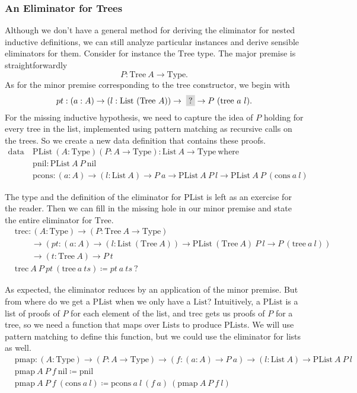 \documentclass{report}
\newcommand{\List}{\const{List}}
\newcommand{\nil}{\const{nil}}
\newcommand{\cons}{\const{cons}}
\newcommand{\PList}{\const{PList}}
\newcommand{\pnil}{\const{pnil}}
\newcommand{\pcons}{\const{pcons}}
\newcommand{\Tree}{\const{Tree}}
\newcommand{\tree}{\const{tree}}
\newcommand{\const}[1]{\text{#1}}
\newcommand{\hole}{\colorbox{gray!30}{?}}
\newcommand{\data}{\const{data}}
\newcommand{\Type}{\const{Type}}
\newcommand{\where}{\const{where}}
\begin{document}
\subsubsection{An Eliminator for Trees}


Although we don't have a general method for deriving the eliminator for nested inductive definitions, we can still analyze particular instances and derive sensible eliminators for them. Consider for instance the $\Tree$ type. The major premise is straightforwardly $$P: \Tree ~ A \to \Type.$$ As for the minor premise corresponding to the $\tree$ constructor, we begin with $$pt: (a: A) \to (l: \List ~ (\Tree ~ A)) \to \; \hole \to P ~ (\tree ~ a ~ l).$$ For the missing inductive hypothesis, we need to capture the idea of $P$ holding for every tree in the list, implemented using pattern matching as recursive calls on the trees. So we create a new data definition that contains these proofs.
%
\begin{align*}
    \data ~ &\PList ~ (A: \Type) (P: A \to \Type): \List ~ A \to \Type ~ \where \\
    &\pnil: \PList ~ A ~ P ~ \nil \\
    &\pcons: (a: A) \to (l: \List ~ A) \to P ~ a \to \PList ~ A ~ P ~ l \to \PList ~ A ~ P ~ (\cons ~ a ~ l)
\end{align*}

The type and the definition of the eliminator for $\PList$ is left as an exercise for the reader. Then we can fill in the missing hole in our minor premise and state the entire eliminator for $\Tree$.
%
\begin{align*}
    &\const{trec}: (A: \Type) \to (P: \Tree ~ A \to \Type) \\
    &\qquad\to (pt: (a: A) \to (l: \List ~ (\Tree ~ A)) \to \PList ~ (\Tree ~ A) ~ P ~ l \to P ~ (\tree ~ a ~ l)) \\
    &\qquad\to (t: \Tree ~ A) \to P ~ t \\
    &\const{trec} ~ A ~ P ~ pt ~ (\tree ~ a ~ ts) \coloneqq pt ~ a ~ ts ~ ?
\end{align*}

As expected, the eliminator reduces by an application of the minor premise. But from where do we get a $\PList$ when we only have a $\List$? Intuitively, a $\PList$ is a list of proofs of $P$ for each element of the list, and $\const{trec}$ gets us proofs of $P$ for a tree, so we need a function that maps over $\List$s to produce $\PList$s. We will use pattern matching to define this function, but we could use the eliminator for lists as well.
%
\begin{align*}
    &\const{pmap}: (A: \Type) \to (P: A \to \Type) \to (f: (a: A) \to P ~ a) \to (l: \List ~ A) \to \PList ~ A ~ P ~ l \\
    &\const{pmap} ~ A ~ P ~ f ~ \nil \coloneqq \pnil \\
    &\const{pmap} ~ A ~ P ~ f ~ (\cons ~ a ~ l) \coloneqq \pcons ~ a ~ l ~ (f ~ a) ~ (\const{pmap} ~ A ~ P ~ f ~ l)
\end{align*}
\end{document}
